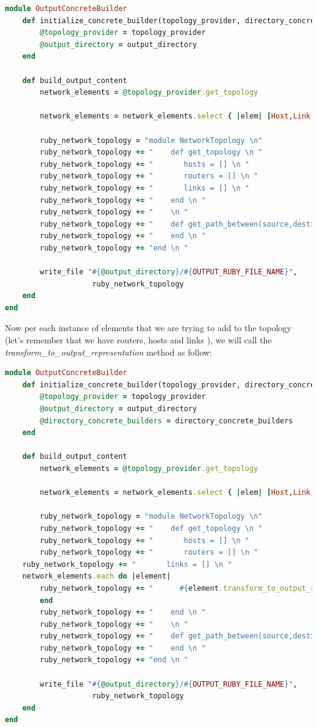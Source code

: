 \begin{lstlisting}[language=Ruby,breaklines=true]
module OutputConcreteBuilder
	def initialize_concrete_builder(topology_provider, directory_concrete_builders, output_directory)
		@topology_provider = topology_provider
		@output_directory = output_directory
	end
    
    def build_output_content
		network_elements = @topology_provider.get_topology
        
        network_elements = network_elements.select { |elem| [Host,Link,Router].include? elem.class }    
    
    	ruby_network_topology = "module NetworkTopology \n"
    	ruby_network_topology += "    def get_topology \n "
    	ruby_network_topology += "       hosts = [] \n "
    	ruby_network_topology += "       routers = [] \n "
    	ruby_network_topology += "       links = [] \n "
    	ruby_network_topology += "    end \n "
    	ruby_network_topology += "    \n "
    	ruby_network_topology += "    def get_path_between(source,destination) \n "
    	ruby_network_topology += "    end \n "
    	ruby_network_topology += "end \n "
    	
    	write_file "#{@output_directory}/#{OUTPUT_RUBY_FILE_NAME}",
                    ruby_network_topology
    end
end
\end{lstlisting}

Now per each instance of elements that we are trying to add to the topology (let's remember that we have routers, hosts and links ), we will call the \textit{transform\_to\_output\_representation} method as follow:

\begin{lstlisting}[language=Ruby,breaklines=true]
module OutputConcreteBuilder
	def initialize_concrete_builder(topology_provider, directory_concrete_builders, output_directory)
		@topology_provider = topology_provider
		@output_directory = output_directory
		@directory_concrete_builders = directory_concrete_builders
	end
    
    def build_output_content
		network_elements = @topology_provider.get_topology
        
        network_elements = network_elements.select { |elem| [Host,Link,Router].include? elem.class }    
    
    	ruby_network_topology = "module NetworkTopology \n"
    	ruby_network_topology += "    def get_topology \n "
    	ruby_network_topology += "       hosts = [] \n "
    	ruby_network_topology += "       routers = [] \n "
	ruby_network_topology += "       links = [] \n "
	network_elements.each do |element|
		ruby_network_topology += "      #{element.transform_to_output_representation @directory_concrete_builders} \n"
        end
    	ruby_network_topology += "    end \n "
    	ruby_network_topology += "    \n "
    	ruby_network_topology += "    def get_path_between(source,destination) \n "
    	ruby_network_topology += "    end \n "
    	ruby_network_topology += "end \n "
    	
    	write_file "#{@output_directory}/#{OUTPUT_RUBY_FILE_NAME}",
                    ruby_network_topology
    end
end
\end{lstlisting}


